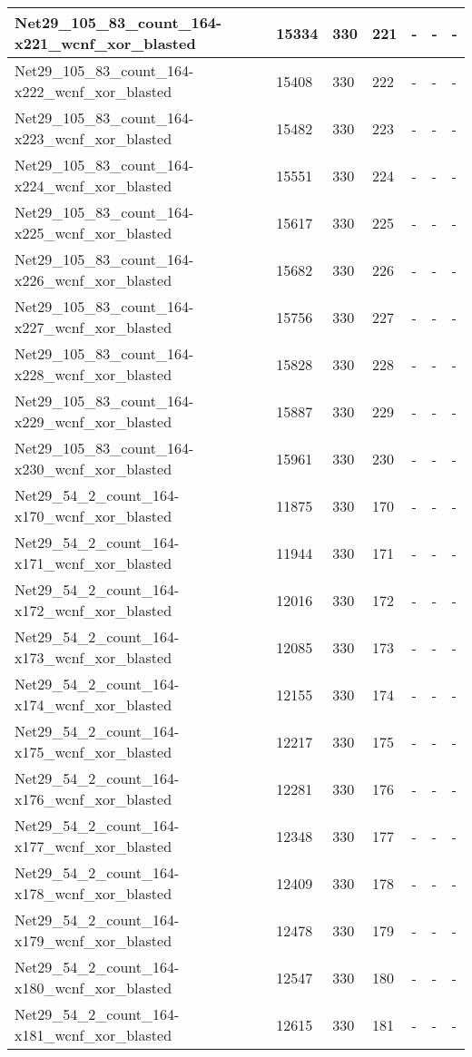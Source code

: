 \begin{scriptsize}
\begin{longtable}{|p{5cm}|l|l|l|l|l|l|}
Net29\_105\_83\_count\_164-x221\_wcnf\_xor\_blasted&15334&330&221&-&-&- \\ \hline 
Net29\_105\_83\_count\_164-x222\_wcnf\_xor\_blasted&15408&330&222&-&-&- \\ \hline 
Net29\_105\_83\_count\_164-x223\_wcnf\_xor\_blasted&15482&330&223&-&-&- \\ \hline 
Net29\_105\_83\_count\_164-x224\_wcnf\_xor\_blasted&15551&330&224&-&-&- \\ \hline 
Net29\_105\_83\_count\_164-x225\_wcnf\_xor\_blasted&15617&330&225&-&-&- \\ \hline 
Net29\_105\_83\_count\_164-x226\_wcnf\_xor\_blasted&15682&330&226&-&-&- \\ \hline 
Net29\_105\_83\_count\_164-x227\_wcnf\_xor\_blasted&15756&330&227&-&-&- \\ \hline 
Net29\_105\_83\_count\_164-x228\_wcnf\_xor\_blasted&15828&330&228&-&-&- \\ \hline 
Net29\_105\_83\_count\_164-x229\_wcnf\_xor\_blasted&15887&330&229&-&-&- \\ \hline 
Net29\_105\_83\_count\_164-x230\_wcnf\_xor\_blasted&15961&330&230&-&-&- \\ \hline 
Net29\_54\_2\_count\_164-x170\_wcnf\_xor\_blasted&11875&330&170&-&-&- \\ \hline 
Net29\_54\_2\_count\_164-x171\_wcnf\_xor\_blasted&11944&330&171&-&-&- \\ \hline 
Net29\_54\_2\_count\_164-x172\_wcnf\_xor\_blasted&12016&330&172&-&-&- \\ \hline 
Net29\_54\_2\_count\_164-x173\_wcnf\_xor\_blasted&12085&330&173&-&-&- \\ \hline 
Net29\_54\_2\_count\_164-x174\_wcnf\_xor\_blasted&12155&330&174&-&-&- \\ \hline 
Net29\_54\_2\_count\_164-x175\_wcnf\_xor\_blasted&12217&330&175&-&-&- \\ \hline 
Net29\_54\_2\_count\_164-x176\_wcnf\_xor\_blasted&12281&330&176&-&-&- \\ \hline 
Net29\_54\_2\_count\_164-x177\_wcnf\_xor\_blasted&12348&330&177&-&-&- \\ \hline 
Net29\_54\_2\_count\_164-x178\_wcnf\_xor\_blasted&12409&330&178&-&-&- \\ \hline 
Net29\_54\_2\_count\_164-x179\_wcnf\_xor\_blasted&12478&330&179&-&-&- \\ \hline 
Net29\_54\_2\_count\_164-x180\_wcnf\_xor\_blasted&12547&330&180&-&-&- \\ \hline 
Net29\_54\_2\_count\_164-x181\_wcnf\_xor\_blasted&12615&330&181&-&-&- \\ \hline 

\end{longtable}
\end{scriptsize}
